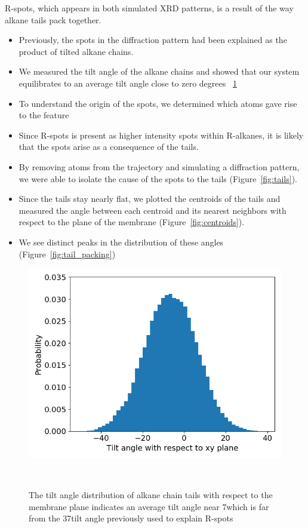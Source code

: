 \documentclass{article}
\begin{document}
  R-spots, which appears in both simulated XRD patterns, is a result of the way 
  alkane tails pack together.
  \begin{itemize}
  	\item Previously, the spots in the diffraction pattern had been explained 
	as the product of tilted alkane chains. %
	\item We measured the tilt angle of the alkane chains and showed that our 
	system equilibrates to an average tilt angle close to zero degrees ~\ref{fig:tilt} %
	\item To understand the origin of the spots, we determined which atoms gave rise to the feature
	\item Since R-spots is present as higher intensity spots within R-alkanes, it is likely
        that the spots arise as a consequence of the tails. 
	\item By removing atoms from the trajectory and simulating a diffraction 
	pattern, we were able to isolate the cause of the spots to the tails (Figure~\ref{fig:tails}).
	\item Since the tails stay nearly flat, we plotted the centroids of the 
	tails and measured the angle between each centroid and its nearest neighbors
	with respect to the plane of the membrane (Figure~\ref{fig:centroids}).  %
	\item We see distinct peaks in the distribution of these angles (Figure~\ref{fig:tail_packing})
  \end{itemize}

  \begin{figure}
  \centering
  \includegraphics[width=0.5\linewidth]{tilt_dist.png}
  \caption{The tilt angle distribution of alkane chain tails with respect to the membrane plane
  indicates an average tilt angle near 7\degree which is far from the 37\degree tilt angle 
  previously used to explain R-spots}~\label{fig:tilt}
  \end{figure}
\end{document}
